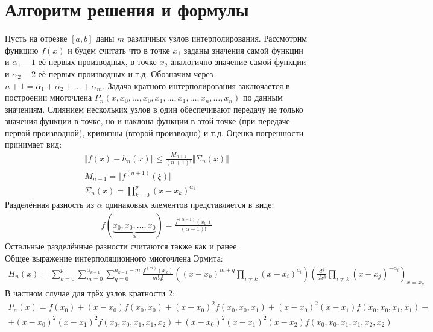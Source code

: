 \documentclass[10pt]{scrartcl}
\begin{document}
\section*{Алгоритм решения и формулы}\noindent
Пусть на отрезке $[a, b]$ даны $m$ различных узлов интерполирования. Рассмотрим функцию $f(x)$ и
будем считать что в точке $x_1$ заданы значения самой функции и $\alpha_1 - 1$ её первых производных,
в точке $x_2$ аналогично значение самой функции и $\alpha_2 - 2$ её первых производных и т.д.
Обозначим через $n + 1 = \alpha_1 + \alpha_2 + \dots + \alpha_m$. Задача кратного интерполирования
заключается в построении многочлена $P_n(x, x_0, \dots, x_0, x_1, \dots, x_1, \dots, x_n, \dots, x_n)
$ по данным значениям. Слиянием нескольких узлов в один обеспечивают передачу не только значения
функции в точке, но и наклона функции в этой точке (при передаче первой производной), кривизны
(второй производно) и т.д.
Оценка погрешности принимает вид:
\begin{gather*}
\Vert f(x) - h_n(x) \Vert \leq \frac{M_{n + 1}}{(n + 1)!} \Vert\Sigma_n(x)\Vert\\
M_{n + 1} = \Vert f^{(n+1)}(\xi)\Vert\\
\Sigma_n(x)=\prod_{k=0}^{p}(x - x_k)^{\alpha_k}
\end{gather*}
Разделённая разность из $\alpha$ одинаковых элементов представляется в виде:
\begin{gather*}
f(\underbrace{x_0, x_0, \dots, x_0}_{\alpha}) = \frac{f^{(\alpha - 1)}(x_0)}
{(\alpha - 1)!}
\end{gather*}
Остальные разделённые разности считаются также как и ранее.\\
Общее выражение интерполяционного многочлена Эрмита:
\begin{gather*}
H_n(x) = \sum_{k = 0}^p \sum_{m = 0}^{\alpha_{k - 1}} \sum_{q = 0}^{a_{k - 1} - m}
\frac{f^{(m)}(x_k)}{m!q!}\left( (x - x_k)^{m  + q}\prod_{i \neq k}(x - x_i)^{a_i}\right)
\left(\frac{d^q}{dx^q}\prod_{i \neq k}(x - x_j)^{-\alpha_i}\right)_{x=x_k}
\end{gather*}
В частном случае для трёх узлов кратности 2:
\begin{gather*}
P_n(x) = f(x_0) + (x - x_0)f(x_0, x_0) + (x - x_0)^2f(x_0, x_0, x_1) +
(x - x_0)^2(x - x_1)f(x_0, x_0, x_1, x_1) + \\ + (x - x_0)^2(x - x_1)^2f(x_0, x_0, x_1, x_1, x_2) +
(x - x_0)^2(x - x_1)^2(x - x_2)f(x_0, x_0, x_1, x_1, x_2, x_2)
\end{gather*}
\end{document}
